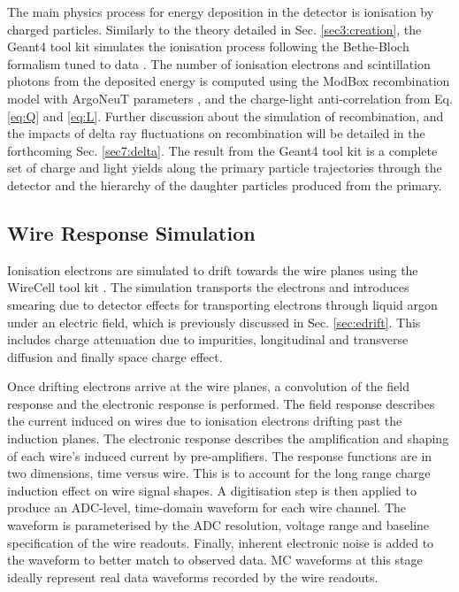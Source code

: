The main physics process for energy deposition in the detector is ionisation by charged particles.
Similarly to the theory detailed in Sec. \ref{sec3:creation}, the Geant4 tool kit simulates the ionisation process following the Bethe-Bloch formalism tuned to data \cite{geant4_ions}.
The number of ionisation electrons and scintillation photons from the deposited energy is computed using the ModBox recombination model with ArgoNeuT parameters \cite{argoneut_recomb}, and the charge-light anti-correlation from Eq. \ref{eq:Q} and \ref{eq:L}. 
Further discussion about the simulation of recombination, and the impacts of delta ray fluctuations on recombination will be detailed in the forthcoming Sec. \ref{sec7:delta}.
The result from the Geant4 tool kit is a complete set of charge and light yields along the primary particle trajectories through the detector and the hierarchy of the daughter particles produced from the primary.

\subsection{Wire Response Simulation}
\label{sec:wire_response}

Ionisation electrons are simulated to drift towards the wire planes using the WireCell tool kit \cite{wirecell}.
The simulation transports the electrons and introduces smearing due to detector effects for transporting electrons through liquid argon under an electric field, which is previously discussed in Sec. \ref{sec:edrift}.
This includes charge attenuation due to impurities, longitudinal and transverse diffusion and finally space charge effect.

Once drifting electrons arrive at the wire planes, a convolution of the field response and the electronic response is performed.                                                                                                          
The field response describes the current induced on wires due to ionisation electrons drifting past the induction planes.                                                                                                           
The electronic response describes the amplification and shaping of each wire's induced current by pre-amplifiers.
The response functions are in two dimensions, time versus wire.
This is to account for the long range charge induction effect on wire signal shapes.
A digitisation step is then applied to produce an ADC-level, time-domain waveform for each wire channel.
The waveform is parameterised by the ADC resolution, voltage range and baseline specification of the wire readouts.
Finally, inherent electronic noise is added to the waveform to better match to observed data.
MC waveforms at this stage ideally represent real data waveforms recorded by the wire readouts.

